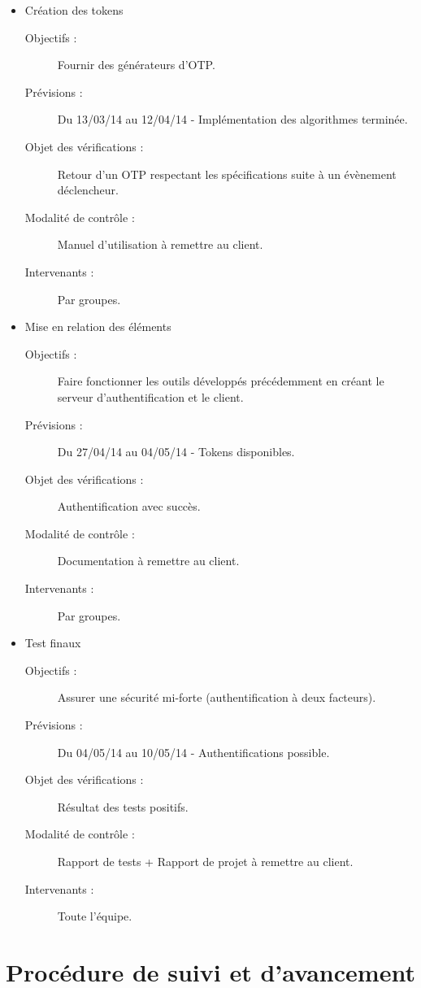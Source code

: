 \documentclass{../../res/univ-projet}
\begin{document}
\begin{itemize}
\begin{description}
	\end{description}
	\item Création des tokens
	\begin{description}
		\item[Objectifs :] Fournir des générateurs d'OTP.
		\item[Prévisions :] Du 13/03/14 au 12/04/14 - Implémentation des algorithmes terminée.
		\item[Objet des vérifications :] Retour d'un OTP respectant les spécifications suite à un évènement déclencheur.
		\item[Modalité de contrôle :] Manuel d'utilisation à remettre au client.
		\item[Intervenants :] Par groupes.
	\end{description}
	\item Mise en relation des éléments
	\begin{description}
		\item[Objectifs :] Faire fonctionner les outils développés précédemment en créant le serveur d'authentification et le client.
		\item[Prévisions :] Du 27/04/14 au 04/05/14 - Tokens disponibles.
		\item[Objet des vérifications :] Authentification avec succès.
		\item[Modalité de contrôle :] Documentation à remettre au client.
		\item[Intervenants :] Par groupes.
	\end{description}
	\item Test finaux
	\begin{description}
		\item[Objectifs :] Assurer une sécurité mi-forte (authentification à deux facteurs).
		\item[Prévisions :] Du 04/05/14 au 10/05/14 - Authentifications possible.
		\item[Objet des vérifications :] Résultat des tests positifs.
		\item[Modalité de contrôle :] Rapport de tests + Rapport de projet à remettre au client.
		\item[Intervenants :] Toute l'équipe.
	\end{description}
\end{itemize}
\section{Procédure de suivi et d'avancement}
\end{document}
